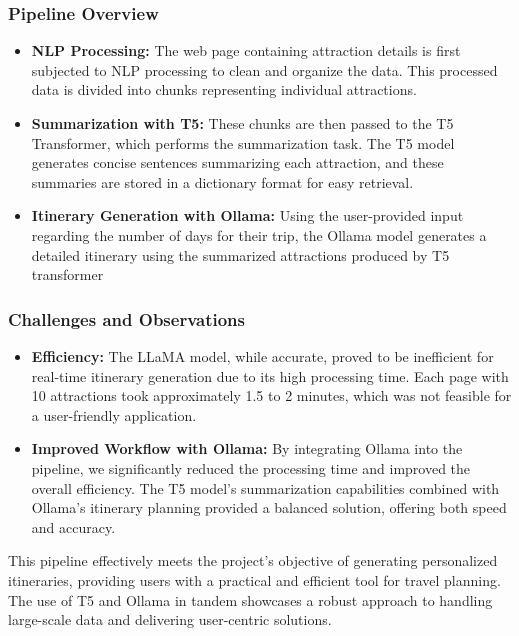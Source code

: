 \documentclass[conference]{IEEEtran}
\begin{document}
        \subsubsection{Pipeline Overview}
            \begin{itemize}
                \item \textbf{NLP Processing:} The web page containing attraction details is first subjected to NLP processing to clean and organize the data. This processed data is divided into chunks representing individual attractions.
                \item \textbf{Summarization with T5:} These chunks are then passed to the T5 Transformer, which performs the summarization task. The T5 model generates concise sentences summarizing each attraction, and these summaries are stored in a dictionary format for easy retrieval.
                \item \textbf{Itinerary Generation with Ollama:} Using the user-provided input regarding the number of days for their trip, the Ollama model generates a detailed itinerary using the summarized attractions produced by T5 transformer
            \end{itemize}

        \subsubsection{Challenges and Observations}
            \begin{itemize}
                \item \textbf{Efficiency:} The LLaMA model, while accurate, proved to be inefficient for real-time itinerary generation due to its high processing time. Each page with 10 attractions took approximately 1.5 to 2 minutes, which was not feasible for a user-friendly application.
                \item \textbf{Improved Workflow with Ollama:} By integrating Ollama into the pipeline, we significantly reduced the processing time and improved the overall efficiency. The T5 model's summarization capabilities combined with Ollama's itinerary planning provided a balanced solution, offering both speed and accuracy.
            \end{itemize}

        This pipeline effectively meets the project's objective of generating personalized itineraries, providing users with a practical and efficient tool for travel planning. The use of T5 and Ollama in tandem showcases a robust approach to handling large-scale data and delivering user-centric solutions.
\end{document}

